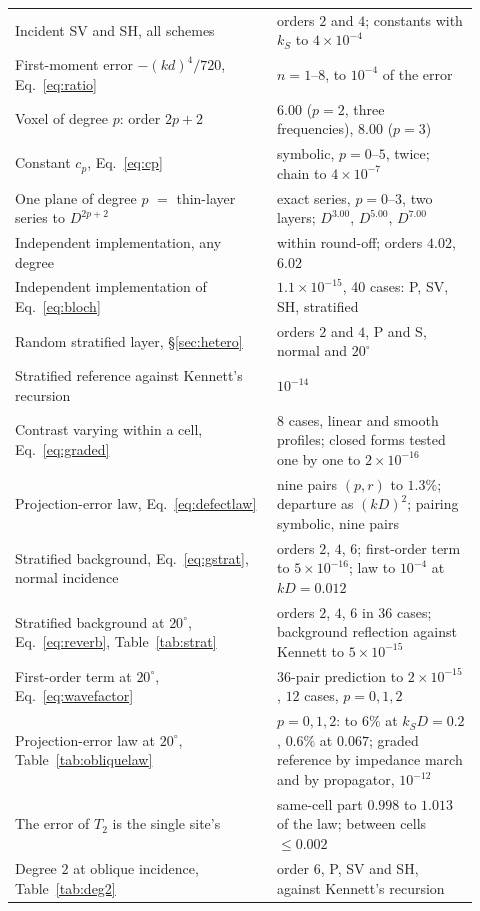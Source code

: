 \documentclass[preprint,review,12pt]{elsarticle}
\begin{document}
\begin{table}[htbp]
\begin{tabular}{@{}>{\raggedright\arraybackslash}p{0.52\linewidth}>{\raggedright\arraybackslash}p{0.40\linewidth}@{}}
Incident SV and SH, all schemes & orders $2$ and $4$; constants with $k_S$ to $4\times10^{-4}$ \\
First-moment error $-(kd)^4/720$, Eq.~\eqref{eq:ratio} & $n=1$--$8$, to $10^{-4}$ of the error \\
Voxel of degree $p$: order $2p+2$ & $6.00$ ($p=2$, three frequencies), $8.00$ ($p=3$) \\
Constant $c_p$, Eq.~\eqref{eq:cp} & symbolic, $p=0$--$5$, twice; chain to $4\times10^{-7}$ \\
One plane of degree $p$ $=$ thin-layer series to $D^{2p+2}$ & exact series, $p=0$--$3$, two layers; $D^{3.00}$, $D^{5.00}$, $D^{7.00}$ \\
Independent implementation, any degree & within round-off; orders $4.02$, $6.02$ \\
Independent implementation of Eq.~\eqref{eq:bloch} & $1.1\times10^{-15}$, 40 cases: P, SV, SH, stratified \\
Random stratified layer, \S\ref{sec:hetero} & orders $2$ and $4$, P and S, normal and $20^\circ$ \\
Stratified reference against Kennett's recursion & $10^{-14}$ \\
Contrast varying within a cell, Eq.~\eqref{eq:graded} & $8$ cases, linear and smooth profiles; closed forms tested one by one to $2\times10^{-16}$ \\
Projection-error law, Eq.~\eqref{eq:defectlaw} & nine pairs $(p,r)$ to $1.3\%$; departure as $(kD)^2$; pairing symbolic, nine pairs \\
Stratified background, Eq.~\eqref{eq:gstrat}, normal incidence & orders $2$, $4$, $6$; first-order term to $5\times10^{-16}$; law to $10^{-4}$ at $kD=0.012$ \\
Stratified background at $20^\circ$, Eq.~\eqref{eq:reverb}, Table~\ref{tab:strat} & orders $2$, $4$, $6$ in $36$ cases; background reflection against Kennett to $5\times10^{-15}$ \\
First-order term at $20^\circ$, Eq.~\eqref{eq:wavefactor} & $36$-pair prediction to $2\times10^{-15}$, $12$ cases, $p=0,1,2$ \\
Projection-error law at $20^\circ$, Table~\ref{tab:obliquelaw} & $p=0,1,2$: to $6\%$ at $k_SD=0.2$, $0.6\%$ at $0.067$; graded reference by impedance march and by propagator, $10^{-12}$ \\
The error of $T_2$ is the single site's & same-cell part $0.998$ to $1.013$ of the law; between cells $\le0.002$ \\
Degree $2$ at oblique incidence, Table~\ref{tab:deg2} & order $6$, P, SV and SH, against Kennett's recursion \\

\end{tabular}
\end{table}
\end{document}

